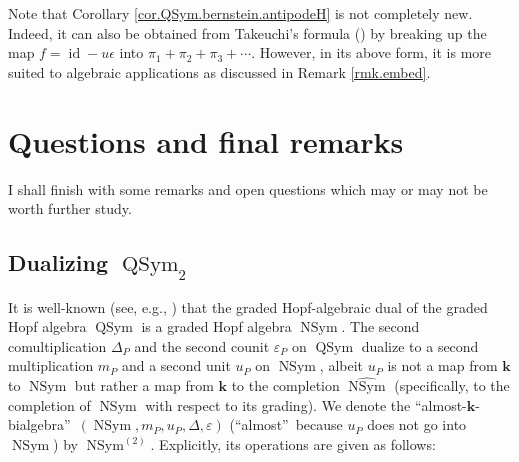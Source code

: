 \documentclass
[numbers=enddot,12pt,final,onecolumn,notitlepage,abstracton]{scrartcl}%
\theoremstyle{definition}
\begin{document}
Note that Corollary \ref{cor.QSym.bernstein.antipodeH} is not completely new.
Indeed, it can also be obtained from Takeuchi's formula (\cite[Proposition
1.4.24]{Reiner}) by breaking up the map $f=\operatorname*{id}-u\epsilon$ into
$\pi_{1}+\pi_{2}+\pi_{3}+\cdots$. However, in its above form, it is more
suited to algebraic applications as discussed in Remark \ref{rmk.embed}.

\section{Questions and final remarks}

I shall finish with some remarks and open questions which may or may not be
worth further study.

\subsection{Dualizing $\operatorname*{QSym}\nolimits_{2}$}

It is well-known (see, e.g., \cite[\S 5.4]{Reiner}) that the graded
Hopf-algebraic dual of the graded Hopf algebra $\operatorname*{QSym}$ is a
graded Hopf algebra $\operatorname*{NSym}$. The second comultiplication
$\Delta_{P}$ and the second counit $\varepsilon_{P}$ on $\operatorname*{QSym}$
dualize to a second multiplication $m_{P}$ and a second unit $u_{P}$ on
$\operatorname*{NSym}$, albeit $u_{P}$ is not a map from $\mathbf{k}$ to
$\operatorname*{NSym}$ but rather a map from $\mathbf{k}$ to the completion
$\widehat{\operatorname*{NSym}}$ (specifically, to the completion of
$\operatorname*{NSym}$ with respect to its grading). We denote the
\textquotedblleft almost-$\mathbf{k}$-bialgebra\textquotedblright\ $\left(
\operatorname*{NSym},m_{P},u_{P},\Delta,\varepsilon\right)  $
(\textquotedblleft almost\textquotedblright\ because $u_{P}$ does not go into
$\operatorname*{NSym}$) by $\operatorname*{NSym}\nolimits^{\left(  2\right)
}$. Explicitly, its operations are given as follows:
\end{document}
